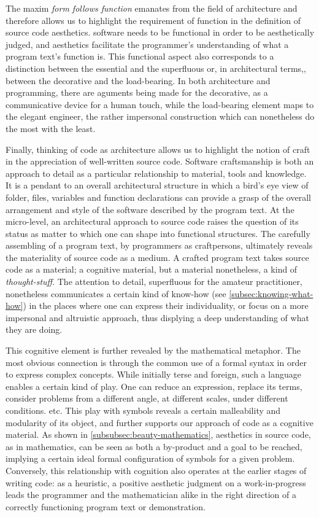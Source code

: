 The maxim \emph{form follows function} emanates from the field of architecture and therefore allows us to highlight the requirement of function in the definition of source code aesthetics. software needs to be functional in order to be aesthetically judged, and aesthetics facilitate the programmer's understanding of what a program text's function is. This functional aspect also corresponds to a distinction between the essential and the superfluous or, in architectural terms,, between the decorative and the load-bearing. In both architecture and programming, there are aguments being made for the decorative, as a communicative device for a human touch, while the load-bearing element maps to the elegant engineer, the rather impersonal construction which can nonetheless do the most with the least.

Finally, thinking of code as architecture allows us to highlight the notion of craft in the appreciation of well-written source code. Software craftsmanship is both an approach to detail as a particular relationship to material, tools and knowledge. It is a pendant to an overall architectural structure in which a bird's eye view of folder, files, variables and function declarations can provide a grasp of the overall arrangement and style of the software described by the program text. At the micro-level, an architectural approach to source code raises the question of its status as matter to which one can shape into functional structures. The carefully assembling of a program text, by programmers as craftpersons, ultimately reveals the materiality of source code as a medium. A crafted program text takes source code as a material; a cognitive material, but a material nonetheless, a kind of \emph{thought-stuff}. The attention to detail, superfluous for the amateur practitioner, nonetheless communicates a certain kind of know-how (see \autoref{subsec:knowing-what-how}) in the places where one can express their individuality, or focus on a more impersonal and altruistic approach, thus displying a deep understanding of what they are doing.

This cognitive element is further revealed by the mathematical metaphor. The most obvious connection is through the common use of a formal syntax in order to express complex concepts. While initially terse and foreign, such a language enables a certain kind of play. One can reduce an expression, replace its terms, consider problems from a different angle, at different scales, under different conditions. etc. This play with symbols reveals a certain malleability and modularity of its object, and further supports our approach of code as a cognitive material. As shown in \autoref{subsubsec:beauty-mathematics}, aesthetics in source code, as in mathematics, can be seen as both a by-product and a goal to be reached, implying a certain ideal formal configuration of symbols for a given problem. Conversely, this relationship with cognition also operates at the earlier stages of writing code: as a heuristic, a positive aesthetic judgment on a work-in-progress leads the programmer and the mathematician alike in the right direction of a correctly functioning program text or demonstration.

